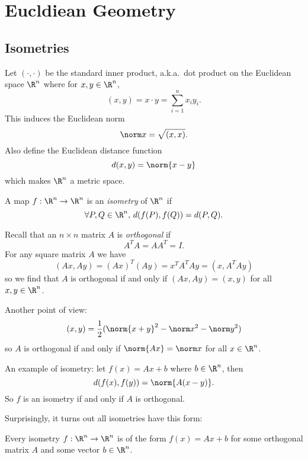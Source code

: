 \documentclass[a4paper]{article}
\begin{document}


\tableofcontents

\section{Eucldiean Geometry}

\subsection{Isometries}

Let \((\cdot, \cdot)\) be the standard inner product, a.k.a.\ dot product on the Euclidean space \(\R^n\) where for \(x, y \in \R^n\),
\[
  (x, y) = x \cdot y = \sum_{i = 1}^{n}x_iy_i.
\]
This induces the Euclidean norm
\[
  \norm x = \sqrt{(x, x)}.
\]
Also define the Euclidean distance function
\[
  d(x, y) = \norm{x - y}
\]
which makes \(\R^n\) a metric space.

\begin{definition}[Isometry]
  A map \(f: \R^n \to \R^n\) is an \emph{isometry} of \(\R^n\) if
  \[
    \forall P, Q \in \R^n,\, d(f(P), f(Q)) = d(P, Q).
  \]
\end{definition}

Recall that an \(n \times n\) matrix \(A\) is \emph{orthogonal} if
\[
  A^TA = AA^T = I.
\]
For any square matrix \(A\) we have
\[
  (Ax, Ay) = (Ax)^T(Ay) = x^TA^TAy = (x, A^TAy)
\]
so we find that \(A\) is orthogonal if and only if \((Ax, Ay) = (x, y)\) for all \(x, y \in \R^n\).

Another point of view:
\[
  (x, y) = \frac{1}{2}(\norm{x + y}^2 -  \norm x^2 - \norm y^2)
\]
so \(A\) is orthogonal if and only if \(\norm{Ax} = \norm x\) for all \(x \in \R^n\).

An example of isometry: let \(f(x) = Ax + b\) where \(b \in \R^n\), then
\[
  d(f(x), f(y)) = \norm{A(x - y)}.
\]
So \(f\) is an isometry if and only if \(A\) is orthogonal.

Surprisingly, it turns out all isometries have this form:

\begin{theorem}
  Every isometry \(f: \R^n \to \R^n\) is of the form \(f(x) = Ax + b\) for some orthogonal matrix \(A\) and some vector \(b \in \R^n\).
\end{theorem}
\end{document}
